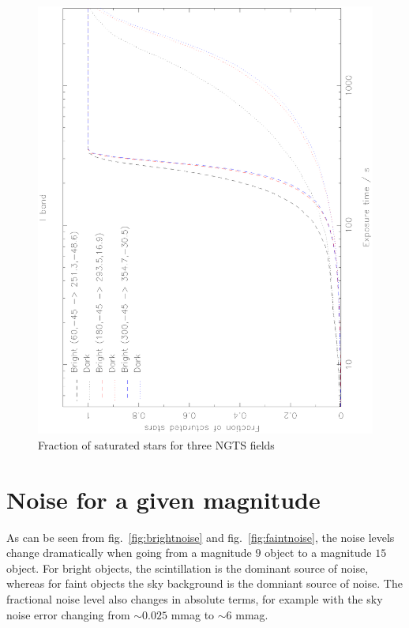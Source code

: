 \documentclass[11pt,a4paper]{report}
\begin{document}
\begin{figure}[h]
    \begin{center}
        \includegraphics[angle=270,width=0.9\columnwidth]{images/fractionsaturated}
    \end{center}
    \caption{Fraction of saturated stars for three NGTS fields}
    \label{fig:fractionsaturated}
\end{figure}



\section{Noise for a given magnitude}
\label{sec:noisepermag}

As can be seen from fig.~\ref{fig:brightnoise} and
fig.~\ref{fig:faintnoise}, the noise levels change dramatically when
going from a magnitude $9$ object to a magnitude $15$ object. For
bright objects, the scintillation is the dominant source of noise,
whereas for faint objects the sky background is the domniant source of
noise. The fractional noise level also changes in absolute terms, 
for example with the sky noise error changing from
$\sim 0.025$ mmag  to $\sim 6$ mmag.
\end{document}
